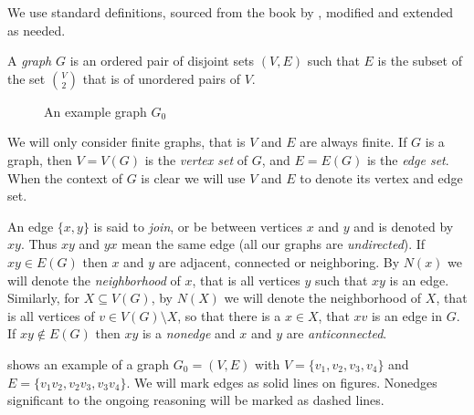 
We use standard definitions, sourced from the book by \citeauthor{BB98} , modified and extended as needed.

\begin{defn}[graph]
  A \emph{graph} $G$ is an ordered pair of disjoint sets $(V, E)$ such that $E$ is the subset of the set $V \choose 2$ that is of unordered pairs of $V$.
\end{defn}

\begin{wrapfigure}{r}{0.4\textwidth}
  \centering{}
  \caption{An example graph $G_0$}
  \label{fig:examplePath}
\end{wrapfigure}

We will only consider finite graphs, that is $V$ and $E$ are always finite. If $G$ is a graph, then $V = V(G)$ is the \emph{vertex set} of $G$, and $E = E(G)$ is the \emph{edge set}. When the context of $G$ is clear we will use $V$ and $E$ to denote its vertex and edge set.

An edge $\{x, y\}$ is said to \emph{join}, or be between vertices $x$ and $y$ and is denoted by $xy$. Thus $xy$ and $yx$ mean the same edge (all our graphs are \emph{undirected}). If $xy \in E(G)$ then $x$ and $y$ are adjacent, connected or neighboring. By $N(x)$ we will denote the \emph{neighborhood} of $x$, that is all vertices $y$ such that $xy$ is an edge. Similarly, for $X \subseteq V(G)$, by $N(X)$ we will denote the neighborhood of $X$, that is all vertices of $v \in V(G) \setminus X$, so that there is a $x \in X$, that $xv$ is an edge in $G$. If $xy \notin E(G)$ then $xy$ is a \emph{nonedge} and $x$ and $y$ are \emph{anticonnected}.

 shows an example of a graph $G_0 = (V, E)$ with $V = \{v_1, v_2, v_3, v_4\}$ and $E = \{v_1v_2, v_2v_3, v_3v_4\}$. We will mark edges as solid lines on figures. Nonedges significant to the ongoing reasoning will be marked as dashed lines.

